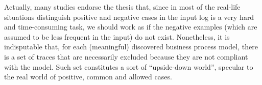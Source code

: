 %
%
Actually, many studies endorse the thesis that, since in most of the real-life situations distinguish positive and negative cases in the input log is a very hard and time-consuming task, we should work as if the negative examples (which are assumed to be less frequent in the input) do not exist. Nonetheless, it is indisputable that, for each (meaningful) discovered business process model, there is a set of traces that are necessarily excluded because they are not compliant with the model. Such set constitutes a sort of ``upside-down world'', specular to the real world of positive, common and allowed cases. 



